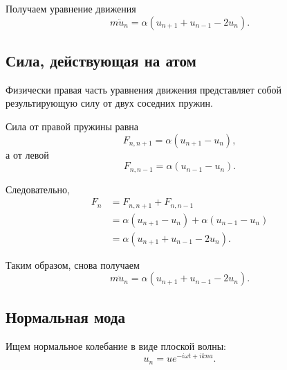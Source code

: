 \documentclass[../final.tex]{subfiles}
\begin{document}
Получаем уравнение движения
%
\begin{equation*}
    \boxed{
        m\ddot u_n
        =
        \alpha
        \left(
            u_{n+1}
            +
            u_{n-1}
            -
            2u_n
        \right)
    }.
\end{equation*}



\subsection*{Сила, действующая на атом}

Физически правая часть уравнения движения представляет собой
результирующую силу от двух соседних пружин.

Сила от правой пружины равна
%
\begin{equation*}
    F_{n,n+1}
    =
    \alpha
    (u_{n+1}-u_n),
\end{equation*}
%
а от левой
%
\begin{equation*}
    F_{n,n-1}
    =
    \alpha
    (u_{n-1}-u_n).
\end{equation*}

Следовательно,
%
\begin{align*}
    F_n
    &=
    F_{n,n+1}
    +
    F_{n,n-1}
    \\
    &=
    \alpha
    (u_{n+1}-u_n)
    +
    \alpha
    (u_{n-1}-u_n)
    \\
    &=
    \alpha
    \left(
        u_{n+1}
        +
        u_{n-1}
        -
        2u_n
    \right).
\end{align*}

Таким образом, снова получаем
%
\begin{equation*}
    m\ddot u_n
    =
    \alpha
    \left(
        u_{n+1}
        +
        u_{n-1}
        -
        2u_n
    \right).
\end{equation*}



\subsection*{Нормальная мода}

Ищем нормальное колебание в виде плоской волны:
%
\begin{equation*}
    \boxed{
        u_n
        =
        u
        e^{-i\omega t+ikna}
    }.
\end{equation*}
\end{document}
